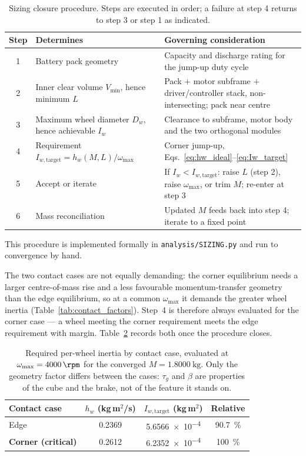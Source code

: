 \begin{table}[htbp]
\centering
\caption[Sizing closure procedure]{Sizing closure procedure. Steps are executed in order; a failure at
step 4 returns to step 3 or step 1 as indicated.}
\label{tab:sizing_procedure}
\small
\begin{tabular}{c L{4.6cm} L{6.4cm}}
\toprule
Step & Determines & Governing consideration \\
 & Battery pack geometry & Capacity and discharge rating for the jump-up duty cycle \\
2 & Inner clear volume $V_{\min}$, hence minimum $L$ & Pack $+$ motor subframe $+$ driver/controller stack, non-intersecting; pack near centre \\
3 & Maximum wheel diameter $D_w$, hence achievable $I_w$ & Clearance to subframe, motor body and the two orthogonal modules \\
4 & Requirement $I_{w,\text{target}} = h_w(M,L)/\omega_{\max}$ & Corner jump-up, Eqs.~\eqref{eq:hw_ideal}--\eqref{eq:Iw_target} \\
5 & Accept or iterate & If $I_w < I_{w,\text{target}}$: raise $L$ (step 2), raise $\omega_{\max}$, or trim $M$; re-enter at step 3 \\
6 & Mass reconciliation & Updated $M$ feeds back into step 4; iterate to a fixed point \\
\bottomrule
\end{tabular}
\end{table}

This procedure is implemented formally in \texttt{analysis/SIZING.py} and run
to convergence by hand.

The two contact cases are not equally demanding: the corner equilibrium needs
a larger centre-of-mass rise and a less favourable momentum-transfer geometry
than the edge equilibrium, so at a common $\omega_{\max}$ it demands the
greater wheel inertia (Table~\ref{tab:contact_factors}). Step~4 is therefore
always evaluated for the corner case --- a wheel meeting the corner
requirement meets the edge requirement with margin. Table~\ref{tab:inertia_cases}
records both once the procedure closes.

\begin{table}[htbp]
\centering
\caption[Required per-wheel inertia by contact case]{Required per-wheel inertia by contact case, evaluated at
$\omega_{\max}=\qty{4000}{\rpm}$ for the converged $M=\qty{1.8000}{\kilo\gram}$.
Only the geometry factor differs between the cases: $\tau_g$ and $\beta$ are
properties of the cube and the brake, not of the feature it stands on.}
\label{tab:inertia_cases}
\begin{tabular}{lccc}
\toprule
Contact case & $h_w$ (kg\,m$^2$/s) & $I_{w,\text{target}}$ (kg\,m$^2$) & Relative \\
\midrule
Edge                       & \num{0.2369} & \num{5.6566e-4} & \qty{90.7}{\percent} \\
\textbf{Corner (critical)} & \num{0.2612} & \num{6.2352e-4} & \qty{100}{\percent} \\
\bottomrule
\end{tabular}
\end{table}

